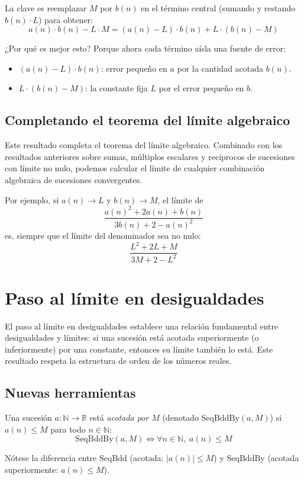 La clave es reemplazar $M$ por $b(n)$ en el término central (sumando y restando
$b(n)\cdot L$) para obtener:
\[
  a(n)\cdot b(n) - L\cdot M
  = (a(n)-L)\cdot b(n) + L\cdot(b(n)-M)
\]

¿Por qué es mejor esto? Porque ahora cada término aísla una fuente de error:
\begin{itemize}
  \item $(a(n)-L)\cdot b(n)$: error pequeño en $a$ por la cantidad acotada $b(n)$.
  \item $L\cdot(b(n)-M)$: la constante fija $L$ por el error pequeño en $b$.
\end{itemize}

\subsection{Completando el teorema del límite algebraico}

Este resultado completa el teorema del límite algebraico. Combinado con los
resultados anteriores sobre sumas, múltiplos escalares y recíprocos de sucesiones
con límite no nulo, podemos calcular el límite de cualquier combinación algebraica
de sucesiones convergentes.

Por ejemplo, si $a(n)\to L$ y $b(n)\to M$, el límite de
\[
  \frac{a(n)^2 + 2a(n) + b(n)}{3b(n) + 2 - a(n)^2}
\]
es, siempre que el límite del denominador sea no nulo:
\[
  \frac{L^2 + 2L + M}{3M + 2 - L^2}
\]

\section{Paso al límite en desigualdades}

El paso al límite en desigualdades establece una relación fundamental entre
desigualdades y límites: si una sucesión está acotada superiormente (o
inferiormente) por una constante, entonces su límite también lo está. Este
resultado respeta la estructura de orden de los números reales.

\subsection{Nuevas herramientas}

\begin{definicion}[SeqBddBy]
  Una sucesión $a : \mathbb{N} \to \mathbb{R}$ está \emph{acotada por $M$}
  (denotado $\mathrm{SeqBddBy}(a, M)$) si $a(n) \leq M$ para todo
  $n \in \mathbb{N}$:
  \[
    \mathrm{SeqBddBy}(a,M) \iff \forall n\in\mathbb{N},\; a(n)\leq M
  \]

  Nótese la diferencia entre $\mathrm{SeqBdd}$ (acotada: $|a(n)|\leq M$) y
  $\mathrm{SeqBddBy}$ (acotada superiormente: $a(n)\leq M$).
\end{definicion}

